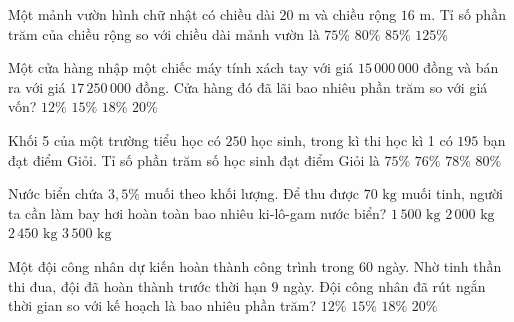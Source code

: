 \begin{ex} %
Một mảnh vườn hình chữ nhật có chiều dài $20\text{ m}$ và chiều rộng $16\text{ m}$. Tỉ số phần trăm của chiều rộng so với chiều dài mảnh vườn là
\choice
{$75\%$}
{\True $80\%$}
{$85\%$}
{$125\%$}
\end{ex}

\begin{ex} %
Một cửa hàng nhập một chiếc máy tính xách tay với giá $15\,000\,000$ đồng và bán ra với giá $17\,250\,000$ đồng. Cửa hàng đó đã lãi bao nhiêu phần trăm so với giá vốn?
\choice
{$12\%$}
{\True $15\%$}
{$18\%$}
{$20\%$}
\end{ex}

\begin{ex} %
Khối 5 của một trường tiểu học có $250$ học sinh, trong kì thi học kì 1 có $195$ bạn đạt điểm Giỏi. Tỉ số phần trăm số học sinh đạt điểm Giỏi là
\choice
{$75\%$}
{$76\%$}
{\True $78\%$}
{$80\%$}
\end{ex}

\begin{ex} %
Nước biển chứa $3{,}5\%$ muối theo khối lượng. Để thu được $70\text{ kg}$ muối tinh, người ta cần làm bay hơi hoàn toàn bao nhiêu ki-lô-gam nước biển?
\choice
{$1\,500\text{ kg}$}
{\True $2\,000\text{ kg}$}
{$2\,450\text{ kg}$}
{$3\,500\text{ kg}$}
\end{ex}

\begin{ex} %
Một đội công nhân dự kiến hoàn thành công trình trong $60$ ngày. Nhờ tinh thần thi đua, đội đã hoàn thành trước thời hạn $9$ ngày. Đội công nhân đã rút ngắn thời gian so với kế hoạch là bao nhiêu phần trăm?
\choice
{$12\%$}
{\True $15\%$}
{$18\%$}
{$20\%$}
\end{ex}

